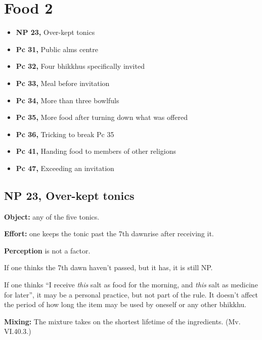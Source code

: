 \chapter{Food 2}

\begin{itemize}
\tightlist
\item
  \textbf{NP 23,} Over-kept tonics
\item
  \textbf{Pc 31,} Public alms centre
\item
  \textbf{Pc 32,} Four bhikkhus specifically invited
\item
  \textbf{Pc 33,} Meal before invitation
\item
  \textbf{Pc 34,} More than three bowlfuls
\item
  \textbf{Pc 35,} More food after turning down what was offered
\item
  \textbf{Pc 36,} Tricking to break Pc 35
\item
  \textbf{Pc 41,} Handing food to members of other religions
\item
  \textbf{Pc 47,} Exceeding an invitation
\end{itemize}

\section{NP 23, Over-kept tonics}


\begin{multicols}{2}

\textbf{Object:} any of the five tonics.

\textbf{Effort:} one keeps the tonic past the 7th dawnrise after
receiving it.

\textbf{Perception} is not a factor.

If one thinks the 7th dawn haven't passed, but it has, it is still NP.

If one thinks ``I receive \emph{this} salt as food for the morning, and
\emph{this} salt as medicine for later'', it may be a personal practice,
but not part of the rule. It doesn't affect the period of how long the
item may be used by oneself or any other bhikkhu.

\end{multicols}

\clearpage

\textbf{Mixing:} The mixture takes on the shortest lifetime of the
ingredients. (Mv. VI.40.3.)

